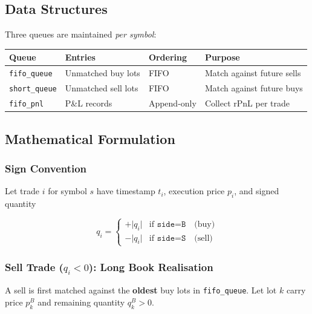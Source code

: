 \documentclass[11pt, a4paper]{article}
\begin{document}
\subsection{Data Structures}

Three queues are maintained \emph{per symbol}:

\begin{center}
\begin{tabular}{@{}llll@{}}
  \toprule
  Queue               & Entries            & Ordering   & Purpose \\
  \midrule
  \texttt{fifo\_queue}  & Unmatched buy lots & FIFO       & Match against future sells \\
  \texttt{short\_queue} & Unmatched sell lots & FIFO      & Match against future buys \\
  \texttt{fifo\_pnl}   & P\&L records       & Append-only & Collect rPnL per trade \\
  \bottomrule
\end{tabular}
\end{center}

\subsection{Mathematical Formulation}

\subsubsection{Sign Convention}

Let trade $i$ for symbol $s$ have timestamp $t_i$, execution price
$p_i$, and signed quantity

\begin{equation}
  q_i =
  \begin{cases}
    +\lvert q_i \rvert & \text{if } \texttt{side} = \texttt{B}
    \quad\text{(buy)} \\[4pt]
    -\lvert q_i \rvert & \text{if } \texttt{side} = \texttt{S}
    \quad\text{(sell)}
  \end{cases}
\end{equation}

\subsubsection{Sell Trade ($q_i < 0$): Long Book Realisation}

A sell is first matched against the \textbf{oldest} buy lots in
\texttt{fifo\_queue}.
Let lot $k$ carry price $p_k^{B}$ and remaining quantity $q_k^{B} > 0$.
\end{document}
